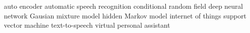 


  {auto encoder}
 {automatic speech recognition}
 {conditional random field}
 {deep neural network}
 {Gausian mixture model}
 {hidden Markov model}
 {internet of things}
 {support vector machine}
 {text-to-speech}
 {virtual personal assistant}



